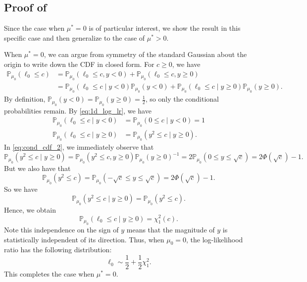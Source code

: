 \documentclass[11pt]{article}
\numberwithin{equation}{section}
\numberwithin{figure}{section}
\begin{document}
\subsection{Proof of }
\label{app:proof-lemma:1d_cdf_part1}

Since the case when $\mu^* = 0$ is of particular interest, we show the result in this specific case and then generalize to the case of $\mu^* > 0$.

When $\mu^* = 0$, we can argue from symmetry of the standard Gaussian about the origin to write down the CDF in closed form. 
For $c \geq 0$, we have
\begin{align}
    \mathbb{P}_{\mu_0} \left(\ell_0 \leq c \right) &= \mathbb{P}_{\mu_0} \left(\ell_0 \leq c, y < 0 \right) + \mathbb{P}_{\mu_0} \left(\ell_0\leq c, y \geq 0 \right) \nonumber \\
    &= \mathbb{P}_{\mu_0} \left(\ell_0 \leq c \mid y < 0 \right)\mathbb{P}_{\mu_0}(y < 0) + \mathbb{P}_{\mu_0} \left(\ell_0 \leq c \mid y \geq 0 \right)\mathbb{P}_{\mu_0}(y \geq 0). \label{eq:tot_prob_form}
\end{align}
By definition, $\mathbb{P}_{\mu_0}(y < 0) = \mathbb{P}_{\mu_0}(y \geq 0) = \frac{1}{2}$, so only the conditional probabilities remain. 
By \eqref{eq:1d_log_lr}, we have
\begin{align}
    \mathbb{P}_{\mu_0} \left(\ell_0 \leq c \mid y < 0 \right) &= \mathbb{P}_{\mu_0} \left(0 \leq c \mid y < 0 \right) = 1 \nonumber \\
    \mathbb{P}_{\mu_0} \left(\ell_0 \leq c \mid y \geq 0 \right) &= \mathbb{P}_{\mu_0} \left(y^2 \leq c \mid y \geq 0 \right). \label{eq:cond_cdf_2}
\end{align}
In \eqref{eq:cond_cdf_2}, we immediately observe that
\begin{equation}
    \mathbb{P}_{\mu_0} \left(y^2 \leq c \mid y \geq 0 \right) = \mathbb{P}_{\mu_0} \left(y^2 \leq c, y \geq 0 \right) \mathbb{P}_{\mu_0} \left(y \geq 0 \right)^{-1} = 2 \mathbb{P}_{\mu_0} \left(0 \leq y \leq \sqrt{c} \right) = 2 \Phi(\sqrt{c}) - 1.
\end{equation}
But we also have that 
\[
\mathbb{P}_{\mu_0} \left(y^2 \leq c \right) = \mathbb{P}_{\mu_0} \left(-\sqrt{c} \leq y \leq \sqrt{c} \right) = 2 \Phi(\sqrt{c}) - 1.
\]
So we have 
\[
\mathbb{P}_{\mu_0} \left(y^2 \leq c \mid y \geq 0 \right) = \mathbb{P}_{\mu_0} \left(y^2 \leq c \right).
\]
Hence, we obtain
\[
\mathbb{P}_{\mu_0} \left(\ell_0 \leq c \mid y \geq 0 \right) = \chi^2_1(c).
\]
Note this independence on the sign of $y$ means that the magnitude of $y$ is statistically independent of its direction. 
Thus, when $\mu_0 = 0$, the log-likelihood ratio has the following distribution:
\begin{equation}
    \ell_0 \sim \frac{1}{2} + \frac{1}{2} \chi^2_1.
\end{equation}
This completes the case when $\mu^* = 0$.
\end{document}
